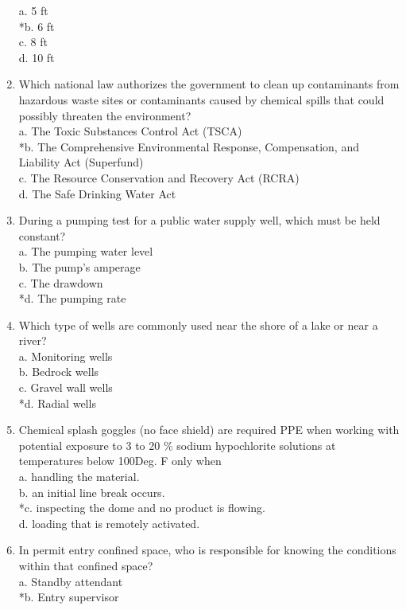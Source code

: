 \begin{enumerate}[1.]
a. 5 ft\\
*b. 6 ft\\
c. 8 ft\\
d. 10 ft\\
\item Which national law authorizes the government to clean up contaminants from hazardous waste sites or contaminants caused by chemical spills that could possibly threaten the environment?\\
a. The Toxic Substances Control Act (TSCA)\\
*b. The Comprehensive Environmental Response, Compensation, and Liability Act (Superfund)\\
c. The Resource Conservation and Recovery Act (RCRA)\\
d. The Safe Drinking Water Act\\
\item During a pumping test for a public water supply well, which must be held constant?\\
a. The pumping water level\\
b. The pump's amperage\\
c. The drawdown\\
*d. The pumping rate\\
\item Which type of wells are commonly used near the shore of a lake or near a river?\\
a. Monitoring wells\\
b. Bedrock wells\\
c. Gravel wall wells\\
*d. Radial wells\\
\item Chemical splash goggles (no face shield) are required PPE when working with potential exposure to 3 to 20 \% sodium hypochlorite solutions at temperatures below 100Deg. F only when\\
a. handling the material.\\
b. an initial line break occurs.\\
*c. inspecting the dome and no product is flowing.\\
d. loading that is remotely activated.\\
\item In permit entry confined space, who is responsible for knowing the conditions within that confined space?\\
a. Standby attendant\\
*b. Entry supervisor\\

\end{enumerate}
